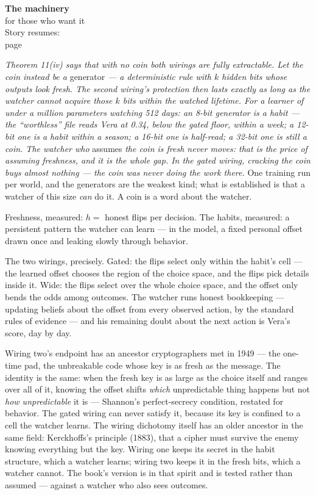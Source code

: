 \begin{machinery}{\textbf{The machinery}\\for those who want it\\[3pt]{\color{muted}Story resumes:\\page~\pageref{partIV}}}

\label{claim-17}

\noindent \emph{Theorem 11(iv) says that with no coin both wirings are fully
extractable. Let the coin instead be a} generator \emph{--- a deterministic
rule with \(k\) hidden bits whose outputs look fresh. The second wiring's
protection then lasts exactly as long as the watcher cannot acquire those \(k\) bits within the watched lifetime. For a learner of under a
million parameters watching 512 days: an 8-bit generator is a habit ---
the ``worthless'' file reads Vera at 0.34, below the gated floor, within
a week; a 12-bit one is a habit within a season; a 16-bit one is
half-read; a 32-bit one is still a coin. The watcher who} assumes \emph{the
coin is fresh never moves: that is the price of assuming freshness,
and it is the whole gap. In the gated wiring, cracking the coin buys
almost nothing --- the coin was never doing the work there.} One
training run per world, and the generators are the weakest kind; what
is established is that a watcher of this size \emph{can} do it. A coin is a
word about the watcher.


Freshness, measured: \(h =\) honest flips per decision. The habits, measured: a
persistent pattern the watcher can learn --- in the model, a fixed
personal offset drawn once and leaking slowly through behavior.

The two wirings, precisely. Gated: the flips select only within the
habit's cell --- the learned offset chooses the region of the choice
space, and the flips pick details inside it. Wide: the flips select
over the whole choice space, and the offset only bends the odds among
outcomes. The watcher
runs honest bookkeeping --- updating beliefs about the offset from every
observed action, by the standard rules of evidence --- and his remaining
doubt about the next action is Vera's score, day by day.

Wiring two's endpoint has an ancestor cryptographers met in 1949 ---
the one-time pad, the unbreakable code whose key is as fresh as the
message. The identity is the same: when the fresh key
is as large as the choice itself and ranges over all of it, knowing
the offset shifts \emph{which} unpredictable thing happens but not \emph{how
unpredictable} it is --- Shannon's perfect-secrecy condition, restated
for behavior. The gated wiring can never satisfy it, because its key
is confined to a cell the watcher learns. The wiring dichotomy itself has an older ancestor in the same field: Kerckhoffs's principle (1883), that a cipher must survive the enemy knowing everything but the key. Wiring one keeps its secret in the habit structure, which a watcher learns; wiring two keeps it in the fresh bits, which a watcher cannot. The book's version is in that spirit and is tested rather than assumed --- against a watcher who also sees outcomes.


\end{machinery}
